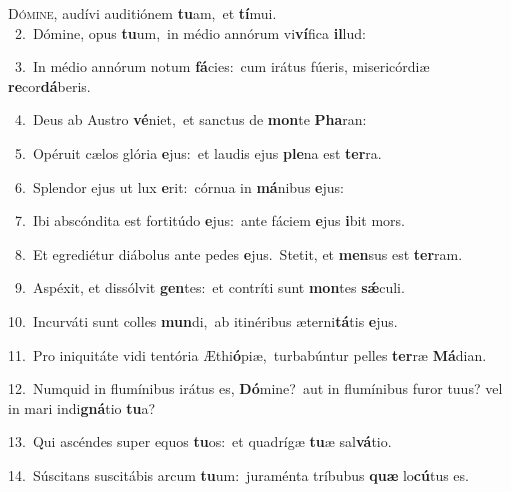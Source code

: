 \lettrine{\initial\textcolor{\initialcolor}{D}}{ómine,} audívi auditiónem \textbf{tu}\-am,~\star et \textbf{tí}\-mui.\\
{\numbfont\textcolor{\numbcolor}{~2.}}~Dómine, opus \textbf{tu}\-um,~\star in médio annórum vi\-\textbf{ví}\-fica \textbf{il}\-lud:\par
{\numbfont\textcolor{\numbcolor}{~3.}}~In médio annórum notum \textbf{fá}\-cies:~\star cum irátus fúeris, misericórdiæ \textbf{re}\-cor\-\textbf{dá}\-beris.\par
{\numbfont\textcolor{\numbcolor}{~4.}}~Deus ab Austro \textbf{vé}\-niet,~\star et sanctus de \textbf{mon}\-te \textbf{Pha}\-ran:\par
{\numbfont\textcolor{\numbcolor}{~5.}}~Opéruit cælos glória \textbf{e}\-jus:~\star et laudis ejus \textbf{ple}\-na est \textbf{ter}\-ra.\par
{\numbfont\textcolor{\numbcolor}{~6.}}~Splendor ejus ut lux \textbf{e}\-rit:~\star córnua in \textbf{má}\-nibus \textbf{e}\-jus:\par
{\numbfont\textcolor{\numbcolor}{~7.}}~Ibi abscóndita est fortitúdo \textbf{e}\-jus:~\star ante fáciem \textbf{e}\-jus \textbf{i}\-bit mors.\par
{\numbfont\textcolor{\numbcolor}{~8.}}~Et egrediétur diábolus ante pedes \textbf{e}\-jus.~\star Stetit, et \textbf{men}\-sus est \textbf{ter}\-ram.\par
{\numbfont\textcolor{\numbcolor}{~9.}}~Aspéxit, et dissólvit \textbf{gen}\-tes:~\star et contríti sunt \textbf{mon}\-tes \textbf{sǽ}\-culi.\par
{\numbfont\textcolor{\numbcolor}{10.}}~Incurváti sunt colles \textbf{mun}\-di,~\star ab itinéribus æterni\-\textbf{tá}\-tis \textbf{e}\-jus.\par
{\numbfont\textcolor{\numbcolor}{11.}}~Pro iniquitáte vidi tentória Æthi\-\textbf{ó}\-piæ,~\star turbabúntur pelles \textbf{ter}\-ræ \textbf{Má}\-dian.\par
{\numbfont\textcolor{\numbcolor}{12.}}~Numquid in flumínibus irátus es, \textbf{Dó}\-mine?~\star aut in flumínibus furor tuus? vel in mari indi\-\textbf{gná}\-tio \textbf{tu}\-a?\par
{\numbfont\textcolor{\numbcolor}{13.}}~Qui ascéndes super equos \textbf{tu}\-os:~\star et quadrígæ \textbf{tu}\-æ sal\-\textbf{vá}\-tio.\par
{\numbfont\textcolor{\numbcolor}{14.}}~Súscitans suscitábis arcum \textbf{tu}\-um:~\star juraménta tríbubus \textbf{quæ} lo\-\textbf{cú}\-tus es.\par
